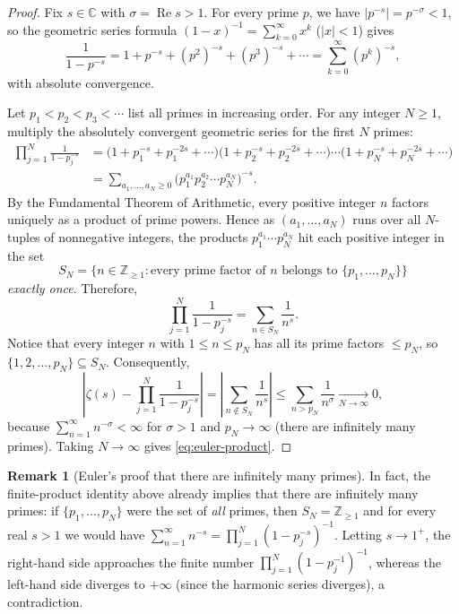 \documentclass[11pt]{article}
\theoremstyle{plain}
\theoremstyle{definition}
\theoremstyle{boldremark}
\newtheorem*{remark}{Remark}
\theoremstyle{remark}
\numberwithin{equation}{section}
\newcommand{\C}{\mathbb{C}}
\newcommand{\Z}{\mathbb{Z}}
\DeclareMathOperator{\Real}{Re}
\begin{document}
\begin{proof}
Fix $s\in\C$ with $\sigma=\Real s > 1$. For every prime $p$, we have
$|p^{-s}|=p^{-\sigma}<1$, so the geometric series formula
$(1-x)^{-1}=\sum_{k=0}^{\infty} x^k$ ($|x|<1$) gives
\[
 \frac{1}{1-p^{-s}}
 = 1 + p^{-s} + (p^2)^{-s} + (p^3)^{-s} + \cdots
 = \sum_{k=0}^{\infty} (p^k)^{-s},
\]
with absolute convergence.

Let $p_1 < p_2 < p_3 < \cdots$ list all primes in increasing order. For any
integer $N\geq 1$, multiply the absolutely convergent geometric series for
the first $N$ primes:
\begin{align*}
 \prod_{j=1}^{N}\frac{1}{1-p_j^{-s}}
 &= \bigl(1 + p_1^{-s} + p_1^{-2s} + \cdots\bigr)
    \bigl(1 + p_2^{-s} + p_2^{-2s} + \cdots\bigr)
    \cdots
    \bigl(1 + p_N^{-s} + p_N^{-2s} + \cdots\bigr) \\
 &= \sum_{a_1,\dots,a_N \geq 0}
    \bigl(p_1^{a_1} p_2^{a_2}\cdots p_N^{a_N}\bigr)^{-s}.
\end{align*}
By the Fundamental Theorem of Arithmetic, every positive integer $n$ factors
uniquely as a product of prime powers. Hence as $(a_1,\dots,a_N)$ runs over
all $N$-tuples of nonnegative integers, the products
$p_1^{a_1}\cdots p_N^{a_N}$ hit each positive integer in the set
\[
 S_N = \{n\in\Z_{\geq 1} : \text{every prime factor of } n \text{ belongs to }
        \{p_1,\dots,p_N\}\}
\]
\emph{exactly once}. Therefore,
\[
 \prod_{j=1}^{N}\frac{1}{1-p_j^{-s}} = \sum_{n\in S_N}\frac{1}{n^s}.
\]
Notice that every integer $n$ with $1\leq n\leq p_N$ has all its prime
factors $\leq p_N$, so $\{1,2,\dots,p_N\}\subseteq S_N$. Consequently,
\[
 \left|\zeta(s) - \prod_{j=1}^{N}\frac{1}{1-p_j^{-s}}\right|
 = \left|\sum_{n\notin S_N}\frac{1}{n^s}\right|
 \leq \sum_{n > p_N}\frac{1}{n^{\sigma}} \xrightarrow[N\to\infty]{} 0,
\]
because $\sum_{n=1}^{\infty} n^{-\sigma} < \infty$ for $\sigma > 1$ and
$p_N\to\infty$ (there are infinitely many primes). Taking $N\to\infty$
gives \eqref{eq:euler-product}.
\end{proof}

\begin{remark}[Euler's proof that there are infinitely many primes]
In fact, the finite-product identity above already implies that there are
infinitely many primes: if $\{p_1,\dots,p_N\}$ were the set of \emph{all}
primes, then $S_N=\Z_{\geq 1}$ and for every real $s>1$ we would have
$\sum_{n=1}^{\infty} n^{-s} = \prod_{j=1}^{N}(1-p_j^{-s})^{-1}$. Letting
$s\to 1^+$, the right-hand side approaches the finite number
$\prod_{j=1}^{N}(1-p_j^{-1})^{-1}$, whereas the left-hand side diverges to
$+\infty$ (since the harmonic series diverges), a contradiction.
\end{remark}
\end{document}
